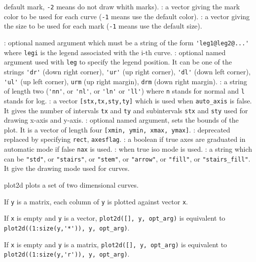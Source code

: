 \begin{parameters}
\begin{varlist}
\begin{varlist}
    default mark, \verb!-2! means do not draw whith marks).
    :  a vector giving the mark color to be used for each curve (\verb!-1! means use the
    default  color).
    : a vector giving the size to be used for each mark (\verb!-1! means use the
    default size).
    \end{varlist}
    : optional named argument which must be a string of the form
    \verb!'leg1@leg2@...'! where \verb!legi! is the legend associated with the i-th curve.
    : optional named argument used with \verb!leg! to specify the legend position.
    It can be one of the strings \verb!'dr'! (down right corner), \verb!'ur'! (up right corner), \verb!'dl'! (down left corner), \verb!'ul'!  (up left corner),
    \verb!urm! (up right margin), \verb!drm! (down right margin).
    : a string of length two (\verb!'nn'!, or \verb!'nl'!, or \verb!'ln'! or
    \verb!'ll'!) where \verb!n! stands for normal and \verb!l! stands for log.
    : a vector \verb![stx,tx,sty,ty]! which is used when
    \verb!auto_axis! is false. It gives the number of intervals \verb!tx! and
    \verb!ty! and subintervals \verb!stx! and \verb!sty! used for drawing x-axis
    and y-axis.
    : optional named argument, sets the bounds of the plot. It is a vector of length four
    \verb+[xmin, ymin, xmax, ymax]+.
    : deprecated replaced by specifying \verb!rect!, \verb!axesflag!.
    : a boolean if true axes are graduated in automatic mode if
    false \verb!nax! is used.
    : when true iso mode is used.
    : a string which can be \verb!"std"!, or \verb!"stairs"!, or \verb!"stem"!,
    or \verb!"arrow"!, or \verb!"fill"!, or \verb!"stairs_fill"!. It give the drawing mode
    used for curves.
  \end{varlist}
\end{parameters}

\begin{mandescription}
  plot2d plots a set of two dimensional curves.

  If \verb+y+ is a matrix, each column of \verb+y+ is plotted against vector
  \verb+x+.

  If \verb+x+ is empty and \verb+y+ is a vector, \verb+plot2d([], y, opt_arg)+ is
  equivalent to \verb|plot2d((1:size(y,'*')), y, opt_arg)|.

  If \verb+x+ is empty and \verb+y+ is a matrix, \verb+plot2d([], y, opt_arg)+ is
  equivalent to \verb|plot2d((1:size(y,'r')), y, opt_arg)|.
\end{mandescription}

